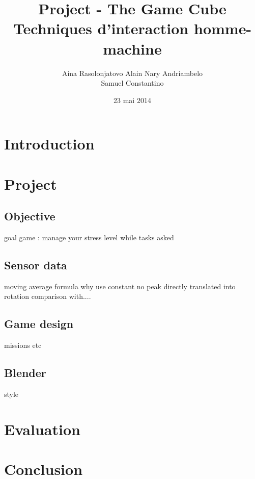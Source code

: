 \documentclass[12pt,a4paper]{article}
\title{\LARGE \textbf{Project - The Game Cube\textregistered}\\
	\bigskip
	\bigskip
	\large Techniques d'interaction homme-machine}
\author{Aina Rasolonjatovo Alain Nary Andriambelo \\ Samuel Constantino}
\date{23 mai 2014}
\begin{document}
	\maketitle


\section{Introduction}



\section{Project}

\subsection{Objective}
goal game : manage your stress level while tasks asked

\subsection{Sensor data}

moving average
formula
why use
	constant
	no peak
	directly translated into rotation
	comparison with....

\subsection{Game design}

missions etc

\subsection{Blender}

style

\section{Evaluation}



\section{Conclusion}
\end{document}
